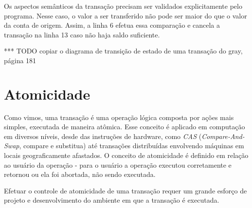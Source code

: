 \documentclass[11pt,twoside,a4paper]{book}
\begin{document}
Os aspectos semânticos da transação precisam ser validados explicitamente pelo programa. Nesse caso, o valor a ser transferido não pode ser maior do que o valor da conta de origem. Assim, a linha 6 efetua essa comparação e cancela a transação na linha 13 caso não haja saldo suficiente.




*** TODO copiar o diagrama de transição de estado de uma transação do gray, página 181

\section{Atomicidade}
\label{sec:atomicidade}
Como vimos, uma transação é uma operação lógica composta por ações mais simples, executada de maneira atômica. Esse conceito é aplicado em computação em diversos níveis, desde das instruções de hardware, como \emph{CAS} (\emph{Compare-And-Swap}, compare e substitua) até transações distribuídas envolvendo máquinas em locais geograficamente afastados. O conceito de atomicidade é definido em relação ao usuário da operação - para o usuário a operação executou corretamente e retornou ou ela foi abortada, não sendo executada.

Efetuar o controle de atomicidade de uma transação requer um grande esforço de projeto e desenvolvimento do ambiente em que a transação é executada.
\end{document}
